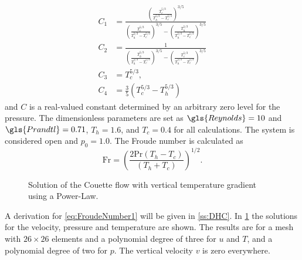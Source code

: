 \begin{subequations}
\begin{align}
	C_1 & = \frac{\left(\frac{T_c^{5/3}}{T_h^{5/3}-T_c^{5/3}}\right)^{3/5}}{\left(\frac{T_c^{5/3}}{T_h^{5/3}-T_c^{5/3}}\right)^{3/5}-\left(\frac{T_h^{5/3}}{T_h^{5/3}-T_c^{5/3}}\right)^{3/5}} \\
	C_2 & = \frac{1}{\left(\frac{T_h^{5/3}}{T_h^{5/3}-T_c^{5/3}}\right)^{3/5}-\left(\frac{T_c^{5/3}}{T_h^{5/3}-T_c^{5/3}}\right)^{3/5}}                                                        \\
	C_3 & = T_c^{5/3},                                                                                                                                                                         \\
	C_4 & = \frac{3}{5}\left(T_c^{5/3}-T_h^{5/3}\right)
\end{align}
\end{subequations}
and $C$ is a real-valued constant determined by an arbitrary zero level for the pressure. The dimensionless parameters are set as $\gls{Reynolds} = 10$ and $\gls{Prandtl} =0.71$, $T_h = 1.6$, and $T_c = 0.4$ for all calculations. The system is considered open and $p_0 =1.0$. The Froude number is calculated as
\begin{equation}
	\text{Fr} = \left( \frac{2\text{Pr}(T_h-T_c)}{(T_h+T_c)}\right)^{1/2}.\label{eq:FroudeNumber1}
\end{equation}
\begin{center}
	\begin{figure}[bt]
		\pgfplotsset{
			group/xticklabels at=edge bottom,
		}
		\caption{Solution of the Couette flow with vertical temperature gradient using a Power-Law.}\label{fig:CouetteSolution}
	\end{figure}
\end{center}%
A derivation for \cref{eq:FroudeNumber1} will be given in \cref{ss:DHC}. In \cref{fig:CouetteSolution} the solutions for the velocity, pressure and temperature are shown. The results are for a mesh with $26\times26$ elements and a polynomial degree of three for $u$ and $T$, and a polynomial degree of two for $p$. The vertical velocity $v$ is zero everywhere. 
